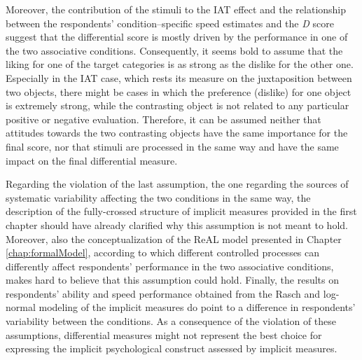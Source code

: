 \documentclass[12pt]{book}
\begin{document}
Moreover, the contribution of the stimuli to the IAT effect and the relationship between the respondents’ condition--specific speed estimates and the \emph{D} score suggest that the differential score is mostly driven by the performance in one of the two associative conditions. 
Consequently, it seems bold to assume that the liking for one of the target categories is as strong as the dislike for the other one. 
Especially in the IAT case, which rests its measure on the juxtaposition between two objects, there might be cases in which the preference (dislike) for one object is extremely strong, while the contrasting object is not related to any particular positive or negative evaluation.
Therefore, it can be assumed neither that attitudes towards the two contrasting objects have the same importance for the final score, nor that stimuli are processed in the same way and have the same impact on the final differential measure. 

Regarding the violation of the last assumption, the one regarding the sources of systematic variability affecting the two conditions in the same way, the description of the fully-crossed structure of implicit measures provided in the first chapter should have already clarified why this assumption is not meant to hold. 
Moreover, also the conceptualization of the ReAL model presented in Chapter \ref{chap:formalModel}, according to which different controlled processes can differently affect respondents' performance in the two associative conditions, makes hard to believe that this assumption could hold. 
Finally, the results on respondents' ability and speed performance obtained from the Rasch and log-normal modeling of the implicit measures do point to a difference in respondents' variability between the conditions.  
As a consequence of the violation of these assumptions, differential measures might not represent the best choice for expressing the implicit psychological construct assessed by implicit measures. 
\end{document}
